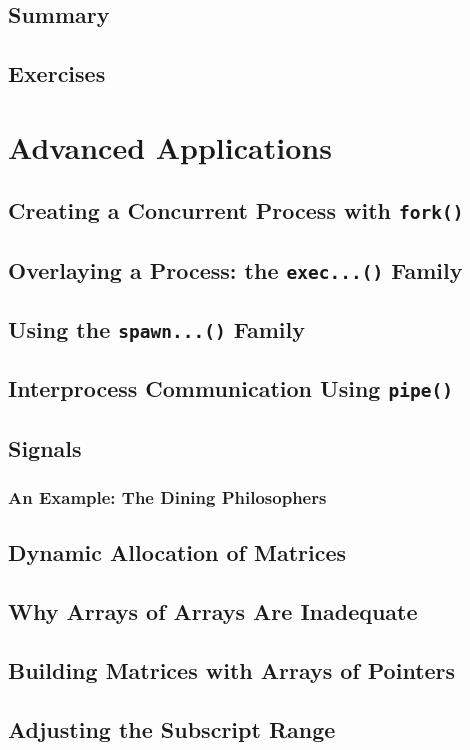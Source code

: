 \documentclass[12pt]{book}
\begin{document}
\section{Summary}
\section{Exercises}

\chapter{Advanced Applications}

\section{Creating a Concurrent Process with \texttt{fork()}}
\section{Overlaying a Process: the \texttt{exec...()} Family}
\section{Using the \texttt{spawn...()} Family}
\section{Interprocess Communication Using \texttt{pipe()}}
\section{Signals}
\subsection{An Example: The Dining Philosophers}
\section{Dynamic Allocation of Matrices}
\section{Why Arrays of Arrays Are Inadequate}
\section{Building Matrices with Arrays of Pointers}
\section{Adjusting the Subscript Range}
\end{document}
